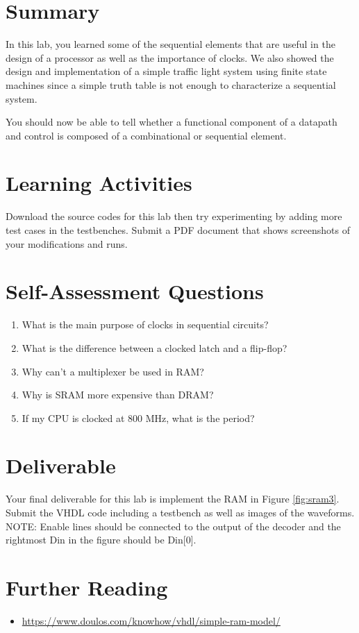 \documentclass[a4paper, 11pt,oneside]{article}
\begin{document}
\section{Summary}
In this lab, you learned some of the sequential elements that are useful in the 
design of a processor as well as the importance of clocks. We also showed the
design and implementation of a simple traffic light system using finite state 
machines since a simple truth table is not enough to characterize a sequential 
system. 

You should now be able to tell whether a functional component of a datapath and 
control is composed of a combinational or sequential element.

\section{Learning Activities}
Download the source codes for this lab then try experimenting by adding more 
test cases in the testbenches. Submit a PDF document that shows screenshots of 
your modifications and runs. 

\section{Self-Assessment Questions}
\begin{enumerate}
\item What is the main purpose of clocks in sequential circuits?
\item What is the difference between a clocked latch and a flip-flop?
\item Why can't a multiplexer be used in RAM?
\item Why is SRAM more expensive than DRAM?
\item If my CPU is clocked at 800 MHz, what is the period?
\end{enumerate}


\section{Deliverable}
Your final deliverable for this lab is implement the RAM in Figure 
 \ref{fig:sram3}. Submit the VHDL code including a testbench as well as images 
of the waveforms. NOTE: Enable lines should be connected to the output of the 
decoder and the rightmost Din in the figure should be Din[0].

\section{Further Reading}
\begin{itemize}
\item 
\href{https://www.doulos.com/knowhow/vhdl/simple-ram-model/}
{https://www.doulos.com/knowhow/vhdl/simple-ram-model/}
\end{itemize}





\nocite{*}
\end{document}
